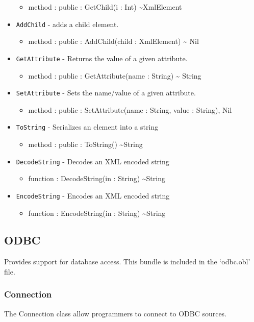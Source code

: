 \documentclass[11pt]{article}
\begin{document}
\begin{itemize}
  \begin{itemize}
  \item method : public : GetChild(i : Int) \textasciitilde XmlElement
  \end{itemize}
\item \texttt{AddChild} - adds a child element.
  \begin{itemize}
  \item method : public : AddChild(child : XmlElement) \textasciitilde
    Nil
  \end{itemize}
\item \texttt{GetAttribute} - Returns the value of a given attribute.
  \begin{itemize}
  \item method : public : GetAttribute(name : String) \textasciitilde
    String
  \end{itemize}
\item \texttt{SetAttribute} - Sets the name/value of a given
  attribute.
  \begin{itemize}
  \item method : public : SetAttribute(name : String, value : String),
    Nil
  \end{itemize}
\item \texttt{ToString} - Serializes an element into a string
  \begin{itemize}
  \item method : public : ToString() \textasciitilde String
  \end{itemize}
\item \texttt{DecodeString} - Decodes an XML encoded string
  \begin{itemize}
  \item function : DecodeString(in : String) \textasciitilde String
  \end{itemize}
\item \texttt{EncodeString} - Encodes an XML encoded string
  \begin{itemize}
  \item function : EncodeString(in : String) \textasciitilde String
  \end{itemize}
\end{itemize}

\subsection{ODBC}
Provides support for database access.  This bundle is included in the `odbc.obl' file.

\subsubsection{Connection}
The Connection class allow programmers to connect to ODBC sources.
\end{document}
